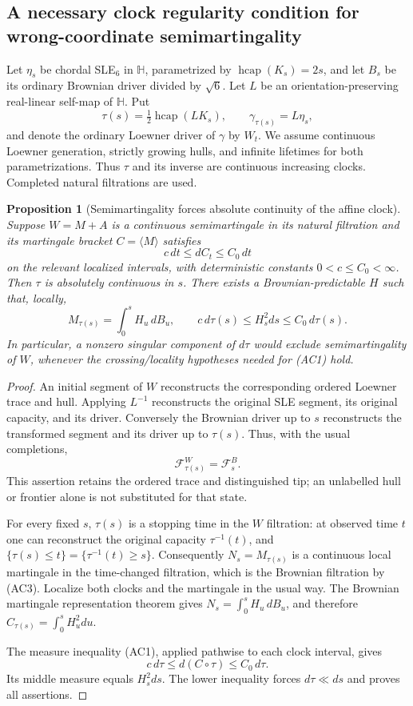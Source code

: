 \documentclass[11pt]{article}
\newtheorem{proposition}[theorem]{Proposition}
\theoremstyle{definition}\newtheorem{definition}[theorem]{Definition}
\theoremstyle{remark}\newtheorem{remark}[theorem]{Remark}
\begin{document}
\subsection{A necessary clock regularity condition for wrong-coordinate semimartingality}
\label{sec:affine-clock-semimartingale-test}

Let $\eta_s$ be chordal SLE$_6$ in $\mathbb H$, parametrized by
$\operatorname{hcap}(K_s)=2s$, and let $B_s$ be its ordinary Brownian driver
divided by $\sqrt6$. Let $L$ be an orientation-preserving real-linear
self-map of $\mathbb H$. Put
\[
 \tau(s)=\tfrac12\operatorname{hcap}(LK_s),\qquad
 \gamma_{\tau(s)}=L\eta_s,
\]
and denote the ordinary Loewner driver of $\gamma$ by $W_t$.
We assume continuous Loewner generation, strictly growing hulls, and
infinite lifetimes for both parametrizations. Thus $\tau$ and its inverse
are continuous increasing clocks. Completed natural filtrations are used.

\begin{proposition}[Semimartingality forces absolute continuity of the affine clock]
\label{prop:affine-clock-ac-necessary}
Suppose $W=M+A$ is a continuous semimartingale in its natural
filtration and its martingale bracket $C=\langle M\rangle$ satisfies
\[
 c\,dt\le dC_t\le C_0\,dt
 \tag{AC1}
\]
on the relevant localized intervals, with deterministic constants
$0<c\le C_0<\infty$. Then $\tau$ is absolutely continuous in $s$.
There exists a Brownian-predictable $H$ such that, locally,
\[
 M_{\tau(s)}=\int_0^s H_u\,dB_u,
 \qquad
 c\,d\tau(s)\le H_s^2ds\le C_0\,d\tau(s).
 \tag{AC2}
\]
In particular, a nonzero singular component of $d\tau$ would exclude
semimartingality of $W$, whenever the crossing/locality hypotheses
needed for (AC1) hold.
\end{proposition}
\begin{proof}
An initial segment of $W$ reconstructs the corresponding ordered
Loewner trace and hull. Applying $L^{-1}$ reconstructs the original
SLE segment, its original capacity, and its driver. Conversely the
Brownian driver up to $s$ reconstructs the transformed segment and
its driver up to $\tau(s)$. Thus, with the usual completions,
\[
 \mathcal F^W_{\tau(s)}=\mathcal F^B_s.
 \tag{AC3}
\]
This assertion retains the ordered trace and distinguished tip; an
unlabelled hull or frontier alone is not substituted for that state.

For every fixed $s$, $\tau(s)$ is a stopping time in the $W$
filtration: at observed time $t$ one can reconstruct the original
capacity $\tau^{-1}(t)$, and
$\{\tau(s)\le t\}=\{\tau^{-1}(t)\ge s\}$.
Consequently $N_s=M_{\tau(s)}$ is a continuous local martingale
in the time-changed filtration, which is the Brownian filtration
by (AC3). Localize both clocks and the martingale in the usual way.
The Brownian martingale representation theorem gives
$N_s=\int_0^sH_u\,dB_u$, and therefore
$C_{\tau(s)}=\int_0^sH_u^2du$.

The measure inequality (AC1), applied pathwise to each clock interval,
gives
\[
 c\,d\tau\le d(C\circ\tau)\le C_0\,d\tau.
\]
Its middle measure equals $H_s^2ds$. The lower inequality forces
$d\tau\ll ds$ and proves all assertions.
\end{proof}
\end{document}
